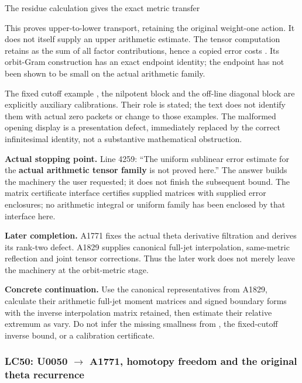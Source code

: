 The residue calculation \protect{} gives the exact metric
transfer


This proves upper-to-lower transport, retaining the original weight-one
action. It does not itself supply an upper arithmetic estimate. The
tensor computation retains \protect{} as the sum of all
\protect{} factor contributions, hence a copied error costs
\protect{}. Its orbit-Gram construction has an exact
endpoint identity; the endpoint has not been shown to be small on the
actual arithmetic family.

The fixed cutoff example \protect{}, the nilpotent block
and the off-line diagonal block are explicitly auxiliary calibrations.
Their role is stated; the text does not identify them with actual zero
packets or change \protect{} to those examples. The malformed
opening display \protect{} is a presentation
defect, immediately replaced by the correct infinitesimal identity, not
a substantive mathematical obstruction.

\textbf{Actual stopping point.} Line 4259: ``The uniform sublinear error
estimate for the \textbf{actual arithmetic tensor family} is not proved
here.'' The answer builds the machinery the user requested; it does not
finish the subsequent bound. The matrix certificate interface certifies
supplied matrices with supplied error enclosures; no arithmetic integral
or uniform family has been enclosed by that interface here.

\textbf{Later completion.} A1771 fixes the actual theta derivative
filtration and derives its rank-two defect. A1829 supplies canonical
full-jet interpolation, same-metric reflection and joint tensor
corrections. Thus the later work does not merely leave the machinery at
the orbit-metric stage.

\textbf{Concrete continuation.} Use the canonical representatives from
A1829, calculate their arithmetic full-jet moment matrices and signed
boundary forms with the inverse interpolation matrix retained, then
estimate their relative extremum as \protect{} vary. Do not
infer the missing smallness from \protect{}, the fixed-cutoff
inverse bound, or a calibration certificate.

\subsubsection{\texorpdfstring{LC50: U0050
\allowbreak{}\ensuremath{→}\allowbreak{} A1771, homotopy freedom and the
original theta
recurrence}{LC50: U0050  A1771, homotopy freedom and the original theta recurrence}}\label{TranscriptLedgerStage:lc50-u0050-a1771-homotopy-freedom-and-the-original-theta-recurrence}

